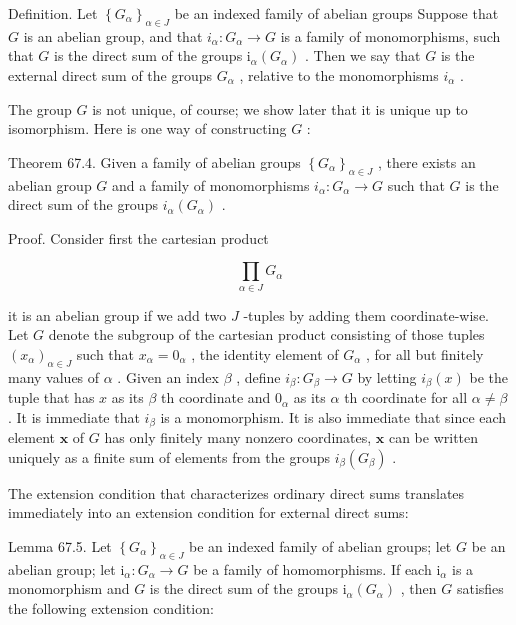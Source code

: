\documentclass[10pt]{article}
\begin{document}
Definition. Let \({\left\{  {G}_{\alpha }\right\}  }_{\alpha  \in  J}\) be an indexed family of abelian groups Suppose that \(G\) is an abelian group, and that \({i}_{\alpha } : {G}_{\alpha } \rightarrow  G\) is a family of monomorphisms, such that \(G\) is the direct sum of the groups \({\mathrm{i}}_{\alpha }\left( {G}_{\alpha }\right)\) . Then we say that \(G\) is the external direct sum of the groups \({G}_{\alpha }\) , relative to the monomorphisms \({i}_{\alpha }\) .

The group \(G\) is not unique, of course; we show later that it is unique up to isomorphism. Here is one way of constructing \(G\) :

Theorem 67.4. Given a family of abelian groups \({\left\{  {G}_{\alpha }\right\}  }_{\alpha  \in  J}\) , there exists an abelian group \(G\) and a family of monomorphisms \({i}_{\alpha } : {G}_{\alpha } \rightarrow  G\) such that \(G\) is the direct sum of the groups \({i}_{\alpha }\left( {G}_{\alpha }\right)\) .

Proof. Consider first the cartesian product

\[
\mathop{\prod }\limits_{{\alpha  \in  J}}{G}_{\alpha }
\]

it is an abelian group if we add two \(J\) -tuples by adding them coordinate-wise. Let \(G\) denote the subgroup of the cartesian product consisting of those tuples \({\left( {x}_{\alpha }\right) }_{\alpha  \in  J}\) such that \({x}_{\alpha } = {0}_{\alpha }\) , the identity element of \({G}_{\alpha }\) , for all but finitely many values of \(\alpha\) . Given an index \(\beta\) , define \({i}_{\beta } : {G}_{\beta } \rightarrow  G\) by letting \({i}_{\beta }\left( x\right)\) be the tuple that has \(x\) as its \(\beta\) th coordinate and \({0}_{\alpha }\) as its \(\alpha\) th coordinate for all \(\alpha  \neq  \beta\) . It is immediate that \({i}_{\beta }\) is a monomorphism. It is also immediate that since each element \(\mathbf{x}\) of \(G\) has only finitely many nonzero coordinates, \(\mathbf{x}\) can be written uniquely as a finite sum of elements from the groups \({i}_{\beta }\left( {G}_{\beta }\right)\) .

The extension condition that characterizes ordinary direct sums translates immediately into an extension condition for external direct sums:

Lemma 67.5. Let \({\left\{  {G}_{\alpha }\right\}  }_{\alpha  \in  J}\) be an indexed family of abelian groups; let \(G\) be an abelian group; let \({\mathrm{i}}_{\alpha } : {G}_{\alpha } \rightarrow  G\) be a family of homomorphisms. If each \({\mathrm{i}}_{\alpha }\) is a monomorphism and \(G\) is the direct sum of the groups \({\mathrm{i}}_{\alpha }\left( {G}_{\alpha }\right)\) , then \(G\) satisfies the following extension condition:
\end{document}
